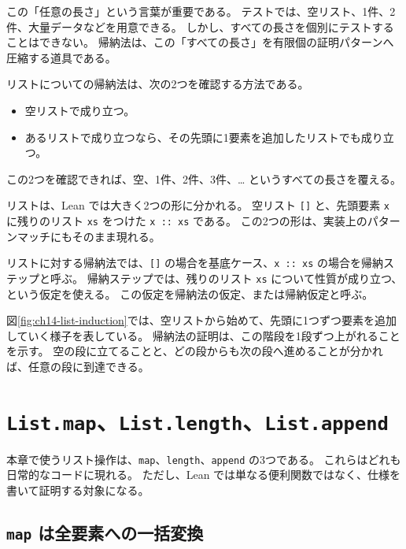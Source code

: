 この「任意の長さ」という言葉が重要である。
テストでは、空リスト、1件、2件、大量データなどを用意できる。
しかし、すべての長さを個別にテストすることはできない。
帰納法は、この「すべての長さ」を有限個の証明パターンへ圧縮する道具である。

\begin{intuitionbox}
リストについての帰納法は、次の2つを確認する方法である。

\begin{itemize}
\item 空リストで成り立つ。
\item あるリストで成り立つなら、その先頭に1要素を追加したリストでも成り立つ。
\end{itemize}

この2つを確認できれば、空、1件、2件、3件、\dots{} というすべての長さを覆える。
\end{intuitionbox}

リストは、Lean では大きく2つの形に分かれる。
空リスト \texttt{[]} と、先頭要素 \texttt{x} に残りのリスト \texttt{xs} をつけた \texttt{x :: xs} である。
この2つの形は、実装上のパターンマッチにもそのまま現れる。

\begin{definitionbox}
リストに対する帰納法では、\texttt{[]} の場合を基底ケース、\texttt{x :: xs} の場合を帰納ステップと呼ぶ。
帰納ステップでは、残りのリスト \texttt{xs} について性質が成り立つ、という仮定を使える。
この仮定を帰納法の仮定、または帰納仮定と呼ぶ。
\end{definitionbox}


図\ref{fig:ch14-list-induction}では、空リストから始めて、先頭に1つずつ要素を追加していく様子を表している。
帰納法の証明は、この階段を1段ずつ上がれることを示す。
空の段に立てることと、どの段からも次の段へ進めることが分かれば、任意の段に到達できる。

\section{\texttt{List.map}、\texttt{List.length}、\texttt{List.append}}

本章で使うリスト操作は、\texttt{map}、\texttt{length}、\texttt{append} の3つである。
これらはどれも日常的なコードに現れる。
ただし、Lean では単なる便利関数ではなく、仕様を書いて証明する対象になる。

\subsection{\texttt{map} は全要素への一括変換}

